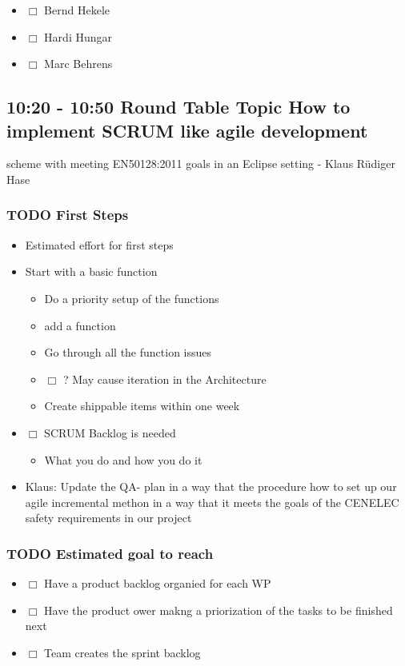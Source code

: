 \documentclass[a4paper,german]{article}
\begin{document}
\begin{itemize}
\item $\Box$ Bernd Hekele
\item $\Box$ Hardi Hungar
\item $\Box$ Marc Behrens
\end{itemize}
\subsection{10:20 - 10:50 Round Table Topic How to implement SCRUM like agile development}
\label{sec-1-3}

                   scheme with meeting EN50128:2011 goals in an Eclipse setting - Klaus Rüdiger Hase
\subsubsection{\textbf{TODO} First Steps}
\label{sec-1-3-1}

\begin{itemize}
\item Estimated effort for first steps
\item Start with a basic function
\begin{itemize}
\item Do a priority setup of the functions
\item add a function
\item Go through all the function issues
\item $\Box$ ? May cause iteration in the Architecture
\item Create shippable items within one week
\end{itemize}
\item $\Box$ SCRUM Backlog is needed
\begin{itemize}
\item What you do and how you do it
\end{itemize}
\item Klaus: Update the QA- plan in a way that the procedure how to set up our 
        agile incremental methon in a way that it meets the goals of the CENELEC 
        safety requirements in our project
\end{itemize}

      
\subsubsection{\textbf{TODO} Estimated goal to reach}
\label{sec-1-3-2}

\begin{itemize}
\item $\Box$ Have a product backlog organied for each WP
\item $\Box$ Have the product ower makng a priorization of the tasks to be finished next
\item $\Box$ Team creates the sprint backlog
\end{itemize}
\end{document}
